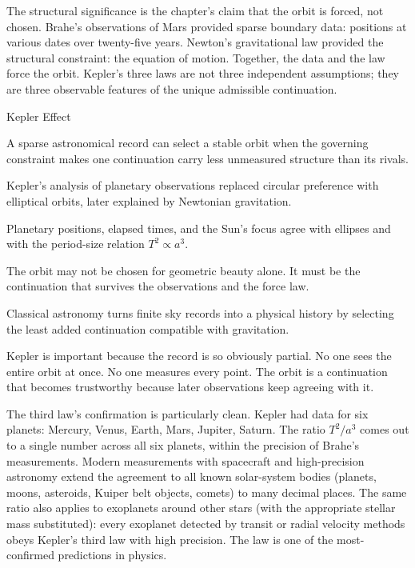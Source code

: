 The structural significance is the chapter's claim that the orbit is
forced, not chosen. Brahe's observations of Mars provided sparse boundary
data: positions at various dates over twenty-five years. Newton's
gravitational law provided the structural constraint: the equation of
motion. Together, the data and the law force the orbit. Kepler's three
laws are not three independent assumptions; they are three observable
features of the unique admissible continuation.

\begin{phenom}{Kepler Effect}
\label{ph:kepler-effect}

\PhStatement A sparse astronomical record can select a stable orbit when the
governing constraint makes one continuation carry less unmeasured structure
than its rivals.

\PhOrigin Kepler's analysis of planetary observations replaced circular
preference with elliptical orbits, later explained by Newtonian gravitation.

\PhObservation Planetary positions, elapsed times, and the Sun's focus agree
with ellipses and with the period-size relation $T^2 \propto a^3$.

\PhConstraint The orbit may not be chosen for geometric beauty alone. It must
be the continuation that survives the observations and the force law.

\PhConsequence Classical astronomy turns finite sky records into a physical
history by selecting the least added continuation compatible with gravitation.

\end{phenom}

Kepler is important because the record is so obviously partial. No one sees
the entire orbit at once. No one measures every point. The orbit is a
continuation that becomes trustworthy because later observations keep
agreeing with it.

The third law's confirmation is particularly clean. Kepler had data for
six planets: Mercury, Venus, Earth, Mars, Jupiter, Saturn. The ratio
$T^2/a^3$ comes out to a single number across all six planets, within
the precision of Brahe's measurements. Modern measurements with
spacecraft and high-precision astronomy extend the agreement to all
known solar-system bodies (planets, moons, asteroids, Kuiper belt
objects, comets) to many decimal places. The same ratio also applies
to exoplanets around other stars (with the appropriate stellar mass
substituted): every exoplanet detected by transit or radial velocity
methods obeys Kepler's third law with high precision. The law is one
of the most-confirmed predictions in physics.

